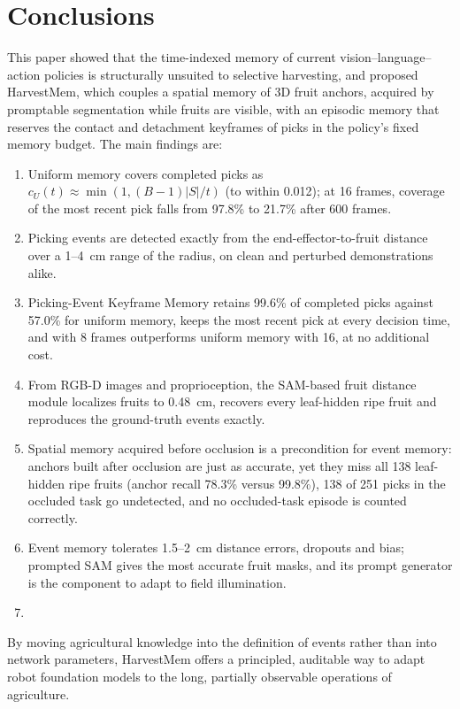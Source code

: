 \section{Conclusions}
\label{sec:conclusions}

This paper showed that the time-indexed memory of current vision--language--action policies is structurally unsuited to selective harvesting, and proposed HarvestMem, which couples a spatial memory of 3D fruit anchors, acquired by promptable segmentation while fruits are visible, with an episodic memory that reserves the contact and detachment keyframes of picks in the policy's fixed memory budget. The main findings are:
\begin{enumerate}
\item Uniform memory covers completed picks as $c_U(t) \approx \min(1, (B-1)|S|/t)$ (to within 0.012); at 16 frames, coverage of the most recent pick falls from 97.8\% to 21.7\% after 600 frames.
\item Picking events are detected exactly from the end-effector-to-fruit distance over a 1--4~cm range of the radius, on clean and perturbed demonstrations alike.
\item Picking-Event Keyframe Memory retains 99.6\% of completed picks against 57.0\% for uniform memory, keeps the most recent pick at every decision time, and with 8 frames outperforms uniform memory with 16, at no additional cost.
\item From RGB-D images and proprioception, the SAM-based fruit distance module localizes fruits to 0.48~cm, recovers every leaf-hidden ripe fruit and reproduces the ground-truth events exactly.
\item Spatial memory acquired before occlusion is a precondition for event memory: anchors built after occlusion are just as accurate, yet they miss all 138 leaf-hidden ripe fruits (anchor recall 78.3\% versus 99.8\%), 138 of 251 picks in the occluded task go undetected, and no occluded-task episode is counted correctly.
\item Event memory tolerates 1.5--2~cm distance errors, dropouts and bias; prompted SAM gives the most accurate fruit masks, and its prompt generator is the component to adapt to field illumination.
\item {}
\end{enumerate}
By moving agricultural knowledge into the definition of events rather than into network parameters, HarvestMem offers a principled, auditable way to adapt robot foundation models to the long, partially observable operations of agriculture.
